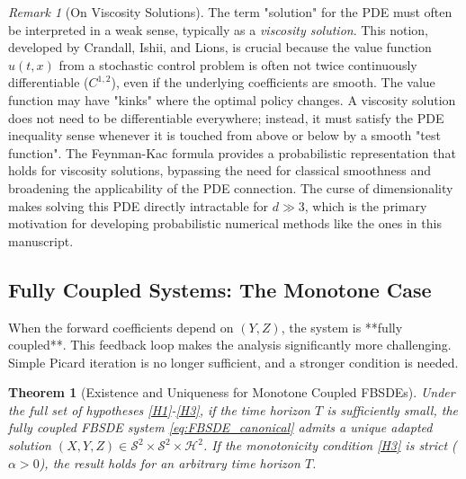 \documentclass[11pt,letterpaper,oneside]{article}
\theoremstyle{plain}
\newtheorem{theorem}{Theorem}[section]
\theoremstyle{definition}
\theoremstyle{remark}
\newtheorem{remark}{Remark}[section]
\begin{document}
\begin{remark}[On Viscosity Solutions]
The term "solution" for the PDE must often be interpreted in a weak sense, typically as a \emph{viscosity solution}. This notion, developed by Crandall, Ishii, and Lions, is crucial because the value function \(u(t,x)\) from a stochastic control problem is often not twice continuously differentiable (\(C^{1,2}\)), even if the underlying coefficients are smooth. The value function may have "kinks" where the optimal policy changes. A viscosity solution does not need to be differentiable everywhere; instead, it must satisfy the PDE inequality sense whenever it is touched from above or below by a smooth "test function". The Feynman-Kac formula provides a probabilistic representation that holds for viscosity solutions, bypassing the need for classical smoothness and broadening the applicability of the PDE connection. The curse of dimensionality makes solving this PDE directly intractable for $d \gg 3$, which is the primary motivation for developing probabilistic numerical methods like the ones in this manuscript.
\end{remark}

\subsection{Fully Coupled Systems: The Monotone Case}
\label{sec:fully_coupled}

When the forward coefficients depend on \((Y,Z)\), the system is **fully coupled**. This feedback loop makes the analysis significantly more challenging. Simple Picard iteration is no longer sufficient, and a stronger condition is needed.

\begin{theorem}[Existence and Uniqueness for Monotone Coupled FBSDEs]
\label{thm:YongMa}
Under the full set of hypotheses \ref{H1}-\ref{H3}, if the time horizon \(T\) is sufficiently small, the fully coupled FBSDE system \eqref{eq:FBSDE_canonical} admits a unique adapted solution \((X,Y,Z) \in \mathcal{S}^2 \times \mathcal{S}^2 \times \mathcal{H}^2\). If the monotonicity condition \ref{H3} is strict (\(\alpha > 0\)), the result holds for an arbitrary time horizon \(T\).
\end{theorem}
\end{document}
